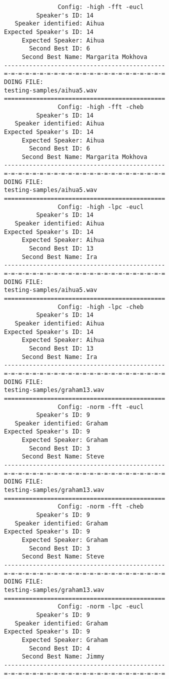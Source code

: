 \begin{verbatim}
               Config: -high -fft -eucl
         Speaker's ID: 14
   Speaker identified: Aihua
Expected Speaker's ID: 14
     Expected Speaker: Aihua
       Second Best ID: 6
     Second Best Name: Margarita Mokhova
---------------------------------------------
=-=-=-=-=-=-=-=-=-=-=-=-=-=-=-=-=-=-=-=-=-=-=
DOING FILE:
testing-samples/aihua5.wav
=============================================
               Config: -high -fft -cheb
         Speaker's ID: 14
   Speaker identified: Aihua
Expected Speaker's ID: 14
     Expected Speaker: Aihua
       Second Best ID: 6
     Second Best Name: Margarita Mokhova
---------------------------------------------
=-=-=-=-=-=-=-=-=-=-=-=-=-=-=-=-=-=-=-=-=-=-=
DOING FILE:
testing-samples/aihua5.wav
=============================================
               Config: -high -lpc -eucl
         Speaker's ID: 14
   Speaker identified: Aihua
Expected Speaker's ID: 14
     Expected Speaker: Aihua
       Second Best ID: 13
     Second Best Name: Ira
---------------------------------------------
=-=-=-=-=-=-=-=-=-=-=-=-=-=-=-=-=-=-=-=-=-=-=
DOING FILE:
testing-samples/aihua5.wav
=============================================
               Config: -high -lpc -cheb
         Speaker's ID: 14
   Speaker identified: Aihua
Expected Speaker's ID: 14
     Expected Speaker: Aihua
       Second Best ID: 13
     Second Best Name: Ira
---------------------------------------------
=-=-=-=-=-=-=-=-=-=-=-=-=-=-=-=-=-=-=-=-=-=-=
DOING FILE:
testing-samples/graham13.wav
=============================================
               Config: -norm -fft -eucl
         Speaker's ID: 9
   Speaker identified: Graham
Expected Speaker's ID: 9
     Expected Speaker: Graham
       Second Best ID: 3
     Second Best Name: Steve
---------------------------------------------
=-=-=-=-=-=-=-=-=-=-=-=-=-=-=-=-=-=-=-=-=-=-=
DOING FILE:
testing-samples/graham13.wav
=============================================
               Config: -norm -fft -cheb
         Speaker's ID: 9
   Speaker identified: Graham
Expected Speaker's ID: 9
     Expected Speaker: Graham
       Second Best ID: 3
     Second Best Name: Steve
---------------------------------------------
=-=-=-=-=-=-=-=-=-=-=-=-=-=-=-=-=-=-=-=-=-=-=
DOING FILE:
testing-samples/graham13.wav
=============================================
               Config: -norm -lpc -eucl
         Speaker's ID: 9
   Speaker identified: Graham
Expected Speaker's ID: 9
     Expected Speaker: Graham
       Second Best ID: 4
     Second Best Name: Jimmy
---------------------------------------------
=-=-=-=-=-=-=-=-=-=-=-=-=-=-=-=-=-=-=-=-=-=-=

\end{verbatim}
